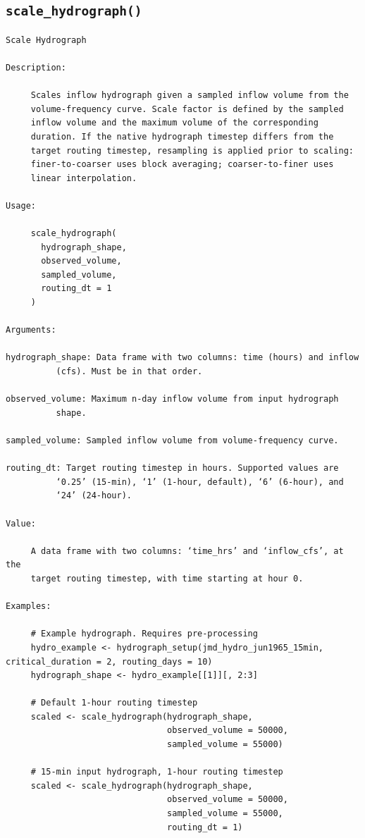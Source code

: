 \documentclass[
  letterpaper,
  DIV=11,
  numbers=noendperiod]{scrreprt}
\begin{document}
\subsection{\texorpdfstring{\texttt{scale\_hydrograph()}}{scale\_hydrograph()}}\label{scale_hydrograph}

\begin{verbatim}
Scale Hydrograph

Description:

     Scales inflow hydrograph given a sampled inflow volume from the
     volume-frequency curve. Scale factor is defined by the sampled
     inflow volume and the maximum volume of the corresponding
     duration. If the native hydrograph timestep differs from the
     target routing timestep, resampling is applied prior to scaling:
     finer-to-coarser uses block averaging; coarser-to-finer uses
     linear interpolation.

Usage:

     scale_hydrograph(
       hydrograph_shape,
       observed_volume,
       sampled_volume,
       routing_dt = 1
     )
     
Arguments:

hydrograph_shape: Data frame with two columns: time (hours) and inflow
          (cfs). Must be in that order.

observed_volume: Maximum n-day inflow volume from input hydrograph
          shape.

sampled_volume: Sampled inflow volume from volume-frequency curve.

routing_dt: Target routing timestep in hours. Supported values are
          ‘0.25’ (15-min), ‘1’ (1-hour, default), ‘6’ (6-hour), and
          ‘24’ (24-hour).

Value:

     A data frame with two columns: ‘time_hrs’ and ‘inflow_cfs’, at the
     target routing timestep, with time starting at hour 0.

Examples:

     # Example hydrograph. Requires pre-processing
     hydro_example <- hydrograph_setup(jmd_hydro_jun1965_15min, critical_duration = 2, routing_days = 10)
     hydrograph_shape <- hydro_example[[1]][, 2:3]
     
     # Default 1-hour routing timestep
     scaled <- scale_hydrograph(hydrograph_shape,
                                observed_volume = 50000,
                                sampled_volume = 55000)
     
     # 15-min input hydrograph, 1-hour routing timestep
     scaled <- scale_hydrograph(hydrograph_shape,
                                observed_volume = 50000,
                                sampled_volume = 55000,
                                routing_dt = 1)
     
\end{verbatim}
\end{document}
